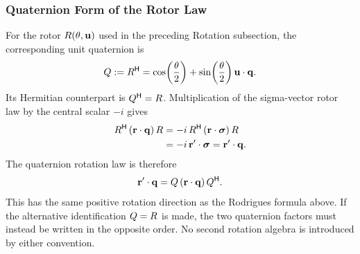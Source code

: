 \subsubsection{Quaternion Form of the Rotor Law}
For the rotor \(R(\theta,\mathbf{u})\) used in the preceding Rotation
subsection, the corresponding unit quaternion is
\begin{equation*}
Q:=R^{\mathsf H}
=\cos\!\left(\frac{\theta}{2}\right)
+\sin\!\left(\frac{\theta}{2}\right)\mathbf{u}\cdot\mathbf{q}.
\end{equation*}
Its Hermitian counterpart is \(Q^{\mathsf H}=R\). Multiplication of the
sigma-vector rotor law by the central scalar \(-i\) gives
\begin{align*}
R^{\mathsf H}\,(\mathbf{r}\cdot\mathbf{q})\,R
&=-i\,R^{\mathsf H}\,(\mathbf{r}\cdot\mathbf{\bm{\sigma}})\,R\\
&=-i\,\mathbf{r}'\cdot\mathbf{\bm{\sigma}}
=\mathbf{r}'\cdot\mathbf{q}.
\end{align*}
The quaternion rotation law is therefore
\begin{equation}
\mathbf{r}'\cdot\mathbf{q}
=Q\,(\mathbf{r}\cdot\mathbf{q})\,Q^{\mathsf H}.
\label{eq:quaternion-rotation}
\end{equation}
This has the same positive rotation direction as the Rodrigues formula above.
If the alternative identification \(Q=R\) is made, the two
quaternion factors must instead be written in the opposite order. No second
rotation algebra is introduced by either convention.

